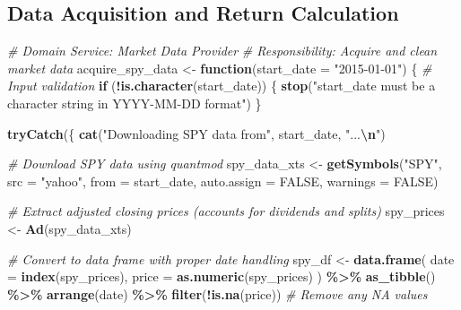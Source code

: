 \documentclass[
]{article}
\newenvironment{Shaded}{\begin{snugshade}}{\end{snugshade}}
\newcommand{\AttributeTok}[1]{\textcolor[rgb]{0.13,0.29,0.53}{#1}}
\newcommand{\CommentTok}[1]{\textcolor[rgb]{0.56,0.35,0.01}{\textit{#1}}}
\newcommand{\ConstantTok}[1]{\textcolor[rgb]{0.56,0.35,0.01}{#1}}
\newcommand{\ControlFlowTok}[1]{\textcolor[rgb]{0.13,0.29,0.53}{\textbf{#1}}}
\newcommand{\FunctionTok}[1]{\textcolor[rgb]{0.13,0.29,0.53}{\textbf{#1}}}
\newcommand{\NormalTok}[1]{#1}
\newcommand{\OtherTok}[1]{\textcolor[rgb]{0.56,0.35,0.01}{#1}}
\newcommand{\SpecialCharTok}[1]{\textcolor[rgb]{0.81,0.36,0.00}{\textbf{#1}}}
\newcommand{\StringTok}[1]{\textcolor[rgb]{0.31,0.60,0.02}{#1}}
\begin{document}
\hypertarget{data-acquisition-and-return-calculation}{%
\subsection{Data Acquisition and Return
Calculation}\label{data-acquisition-and-return-calculation}}

\begin{Shaded}
\begin{Highlighting}[]
\CommentTok{\# Domain Service: Market Data Provider}
\CommentTok{\# Responsibility: Acquire and clean market data}
\NormalTok{acquire\_spy\_data }\OtherTok{\textless{}{-}} \ControlFlowTok{function}\NormalTok{(}\AttributeTok{start\_date =} \StringTok{"2015{-}01{-}01"}\NormalTok{) \{}
  \CommentTok{\# Input validation}
  \ControlFlowTok{if}\NormalTok{ (}\SpecialCharTok{!}\FunctionTok{is.character}\NormalTok{(start\_date)) \{}
    \FunctionTok{stop}\NormalTok{(}\StringTok{"start\_date must be a character string in YYYY{-}MM{-}DD format"}\NormalTok{)}
\NormalTok{  \}}
  
  \FunctionTok{tryCatch}\NormalTok{(\{}
    \FunctionTok{cat}\NormalTok{(}\StringTok{"Downloading SPY data from"}\NormalTok{, start\_date, }\StringTok{"...}\SpecialCharTok{\textbackslash{}n}\StringTok{"}\NormalTok{)}
    
    \CommentTok{\# Download SPY data using quantmod}
\NormalTok{    spy\_data\_xts }\OtherTok{\textless{}{-}} \FunctionTok{getSymbols}\NormalTok{(}\StringTok{"SPY"}\NormalTok{, }
                               \AttributeTok{src =} \StringTok{"yahoo"}\NormalTok{, }
                               \AttributeTok{from =}\NormalTok{ start\_date, }
                               \AttributeTok{auto.assign =} \ConstantTok{FALSE}\NormalTok{, }
                               \AttributeTok{warnings =} \ConstantTok{FALSE}\NormalTok{)}
    
    \CommentTok{\# Extract adjusted closing prices (accounts for dividends and splits)}
\NormalTok{    spy\_prices }\OtherTok{\textless{}{-}} \FunctionTok{Ad}\NormalTok{(spy\_data\_xts)}
    
    \CommentTok{\# Convert to data frame with proper date handling}
\NormalTok{    spy\_df }\OtherTok{\textless{}{-}} \FunctionTok{data.frame}\NormalTok{(}
      \AttributeTok{date =} \FunctionTok{index}\NormalTok{(spy\_prices),}
      \AttributeTok{price =} \FunctionTok{as.numeric}\NormalTok{(spy\_prices)}
\NormalTok{    ) }\SpecialCharTok{\%\textgreater{}\%}
      \FunctionTok{as\_tibble}\NormalTok{() }\SpecialCharTok{\%\textgreater{}\%}
      \FunctionTok{arrange}\NormalTok{(date) }\SpecialCharTok{\%\textgreater{}\%}
      \FunctionTok{filter}\NormalTok{(}\SpecialCharTok{!}\FunctionTok{is.na}\NormalTok{(price))  }\CommentTok{\# Remove any NA values}
    

\end{Highlighting}
\end{Shaded}
\end{document}

